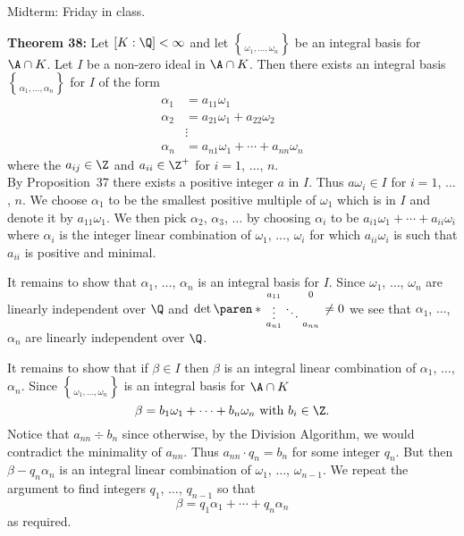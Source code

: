 Midterm: Friday in class.

\textbf{Theorem 38:} Let $[K:\Q]<\infty$ and let $\brace{\omega_1,\dotsc,\omega_n}$ be an integral basis for $\A\cap K$.  Let $I$ be a non-zero ideal in $\A\cap K$.  Then there exists an integral basis $\brace{\alpha_1,\dotsc,\alpha_n}$ for $I$ of the form
\begin{align*}
\alpha_1 &= a_{11}\omega_1 \\
\alpha_2 &= a_{21}\omega_1 + a_{22}\omega_2 \\
&\vdots \\
\alpha_n &= a_{n1}\omega_1 + \dotsb + a_{nn}\omega_n
\end{align*}
where the $a_{ij}\in\Z$ and $a_{ii}\in\Z^+$ for $i=1$, $\dotsc$, $n$. \\
\pf By Proposition~37 there exists a positive integer $a$ in $I$.  Thus $a\omega_i\in I$ for $i=1$, $\dotsc$, $n$.  We choose $\alpha_1$ to be the smallest positive multiple of $\omega_1$ which is in $I$ and denote it by $a_{11}\omega_1$.  We then pick $\alpha_2$, $\alpha_3$, $\dotsc$ by choosing $\alpha_i$ to be $a_{i1}\omega_1+\dotsb+a_{ii}\omega_i$ where $\alpha_i$ is the integer linear combination of $\omega_1$, $\dotsc$, $\omega_i$ for which $a_{ii}\omega_i$ is such that $a_{ii}$ is positive and minimal.

It remains to show that $\alpha_1$, $\dotsc$, $\alpha_n$ is an integral basis for $I$.  Since $\omega_1$, $\dotsc$, $\omega_n$ are linearly independent over $\Q$ and $\det\paren*{\begin{smallmatrix}a_{11}&&0\\\vdots&\ddots\\a_{n1}&&a_{nn}\end{smallmatrix}}\neq0$ we see that $\alpha_1$, $\dotsc$, $\alpha_n$ are linearly independent over $\Q$.

It remains to show that if $\beta\in I$ then $\beta$ is an integral linear combination of $\alpha_1$, $\dotsc$, $\alpha_n$.  Since $\brace{\omega_1,\dotsc,\omega_n}$ is an integral basis for $\A\cap K$
\[ \beta = b_1\omega_1 + \dotsb + b_n\omega_n \text{ with } b_i\in\Z . \]
Notice that $a_{nn}\div b_n$ since otherwise, by the Division Algorithm, we would contradict the minimality of $a_{nn}$.  Thus $a_{nn}\cdot q_n=b_n$ for some integer $q_n$.  But then $\beta-q_n\alpha_n$ is an integral linear combination of $\omega_1$, $\dotsc$, $\omega_{n-1}$.  We repeat the argument to find integers $q_1$, $\dotsc$, $q_{n-1}$ so that
\[ \beta = q_1 \alpha_1 + \dotsb + q_n \alpha_n \]
as required.

